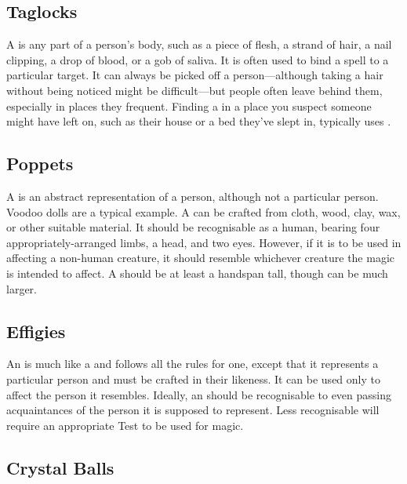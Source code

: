 \subsection{Taglocks}

A  is any part of a person's body, such as a piece of flesh, a strand of hair, a nail clipping, a drop of blood, or a gob of saliva.
It is often used to bind a spell to a particular target.
It can always be picked off a person---although taking a hair without being noticed might be difficult---but people often leave  behind them, especially in places they frequent.
Finding a  in a place you suspect someone might have left on, such as their house or a bed they've slept in, typically uses .

\subsection{Poppets}

A  is an abstract representation of a person, although not a particular person.
Voodoo dolls are a typical example.
A  can be crafted from cloth, wood, clay, wax, or other suitable material.
It should be recognisable as a human, bearing four appropriately-arranged limbs, a head, and two eyes.
However, if it is to be used in  affecting a non-human creature, it should resemble whichever creature the magic is intended to affect.
A  should be at least a handspan tall, though can be much larger.

\subsection{Effigies}

An  is much like a  and follows all the rules for one, except that it represents a particular person and must be crafted in their likeness.
It can be used only to affect the person it resembles.
Ideally, an  should be recognisable to even passing acquaintances of the person it is supposed to represent.
Less recognisable  will require an appropriate Test to be used for magic.

\subsection{Crystal Balls}

